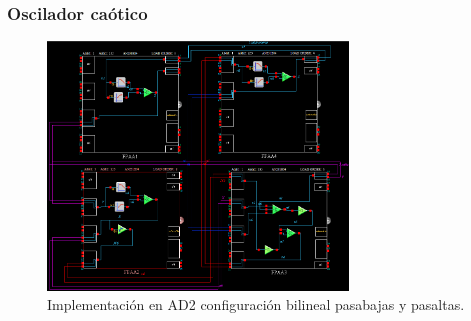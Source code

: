 \documentclass[10pt]{beamer}
\begin{document}
	\begin{frame}
		\frametitle{Oscilador caótico}
		\begin{figure}[!ht]
		\caption{Implementación en AD2 configuración bilineal pasabajas y pasaltas.} 
		\label{fig:Y1p_implementacion}
		\centering
		\includegraphics[width=8cm]{../imagenes/Y1p_implementacion.png}
	\end{figure}
	\end{frame}		
	
	
	
\end{document}
